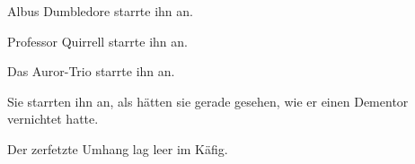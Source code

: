 Albus Dumbledore starrte ihn an.

Professor Quirrell starrte ihn an.

Das Auror-Trio starrte ihn an.

Sie starrten ihn an, als hätten sie gerade gesehen, wie er einen Dementor vernichtet hatte.

Der zerfetzte Umhang lag leer im Käfig.

